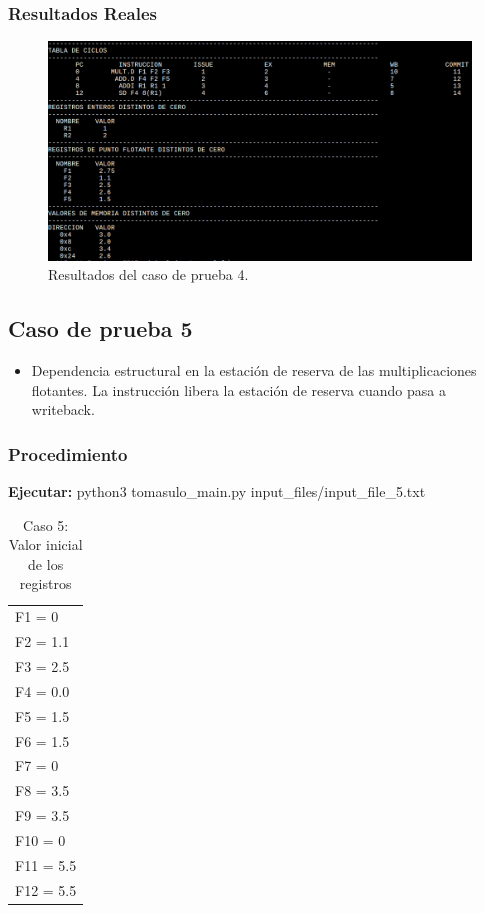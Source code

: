 \documentclass[a4paper]{article}
\begin{document}
	\subsubsection*{Resultados Reales}

	\begin{figure}[H]
	\centering
	\includegraphics[width=1\textwidth]{figures/test4.png}
	\caption{\label{fig:bloques}Resultados del caso de prueba 4.}
	\end{figure}


	\subsection*{Caso de prueba 5}

	\begin{itemize}
		\item Dependencia estructural en la estación de reserva de las multiplicaciones flotantes. La instrucción libera la estación de reserva cuando pasa a writeback.  
	\end{itemize}

	\subsubsection*{Procedimiento}

	\textbf{Ejecutar:} python3 tomasulo\_main.py input\_files/input\_file\_5.txt

	\begin{table}[H]
		\centering
		\caption*{Caso 5: Valor inicial de los registros}
		\begin{tabular}{l}
			F1 = 0 \\
			F2 = 1.1 \\
			F3 = 2.5 \\
			F4 = 0.0 \\
			F5 = 1.5 \\
			F6 = 1.5 \\
			F7 = 0 \\
			F8 = 3.5 \\
			F9 = 3.5 \\
			F10 = 0 \\
			F11 = 5.5 \\
			F12 = 5.5
		\end{tabular}
	\end{table}
\end{document}
